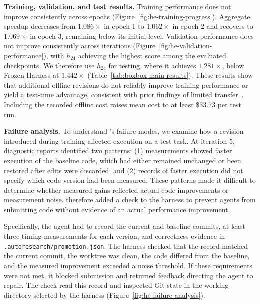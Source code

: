 \textbf{Training, validation, and test results.} Training performance does not improve consistently across epochs (Figure~\ref{fig:he-training-progress}). Aggregate speedup decreases from $1.086\times$ in epoch 1 to $1.062\times$ in epoch 2 and recovers to $1.069\times$ in epoch 3, remaining below its initial level. Validation performance does not improve consistently across iterations (Figure~\ref{fig:he-validation-performance}), with $h_{24}$ achieving the highest score among the evaluated checkpoints. We therefore use $h_{24}$ for testing, where it achieves $1.281\times$, below Frozen Harness at $1.442\times$ (Table~\ref{tab:boxbox-main-results}). These results show that additional offline revisions do not reliably improve training performance or yield a test-time advantage, consistent with prior findings of limited transfer~\citep{wang2026harnessevolution}. Including the recorded offline cost raises mean cost to at least \$33.73 per test run.

\textbf{Failure analysis.} To understand \he{}'s failure modes, we examine how a revision introduced during training affected execution on a test task. At iteration 5, diagnostic reports identified two patterns: (1) measurements showed faster execution of the baseline code, which had either remained unchanged or been restored after edits were discarded; and (2) records of faster execution did not specify which code version had been measured. These patterns made it difficult to determine whether measured gains reflected actual code improvements or measurement noise. \he{} therefore added a check to the harness to prevent agents from submitting code without evidence of an actual performance improvement.

Specifically, the agent had to record the current and baseline commits, at least three timing measurements for each version, and correctness evidence in \texttt{.autoresearch/promotion.json}. The harness checked that the record matched the current commit, the worktree was clean, the code differed from the baseline, and the measured improvement exceeded a noise threshold. If these requirements were not met, it blocked submission and returned feedback directing the agent to repair. The check read this record and inspected Git state in the working directory selected by the harness (Figure~\ref{fig:he-failure-analysis}).

